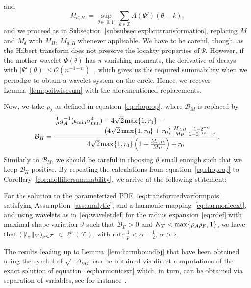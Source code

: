 and
\begin{equation}
    M_{d,H}\coloneqq\sup_{\theta \in [0,1)} \sum_{k \in \mathbb{Z}}A(\Psi')(\theta - k), \label{eq:Mbound4}
\end{equation}
and we proceed as in Subsection~\ref{subsubsec:explicittransformation}, replacing $M$ and $M_d$ with $M_H$, $M_{d,H}$ whenever applicable.
We have to be careful, though, as the Hilbert transform does not preserve the locality properties of $\Psi$.
However, if the mother wavelet $\Psi(\theta)$ has $n$ vanishing moments, the derivative of decays with $\left|  \Psi' (\theta) \right| \leq \mathcal{O}(n^{-1-n})$~\cite{chaudhury2011}, which gives us the required summability when we periodize to obtain a wavelet system on the circle.
Hence, we recover Lemma~\ref{lem:poitwisesum} with the aforementioned replacements.

Now, we take $\rho_\lambda$ as defined in equation~\eqref{eq:rhoprop}, where $\mathcal{B}_M$ is replaced by
\begin{equation}
    \mathcal{B}_H = \frac { \splitfrac{ \frac{1}{\vartheta}g_A^{-1}(\amin\sigma_{\min}^4) - 4\sqrt{2}\max\{1, r_0 \}   -}{\qquad\qquad\qquad\left(4\sqrt{2}\max\{1, r_0 \} + r_0 \right)   \frac{M_{d,H}}{M_H}\frac{1-2^{-\alpha}}{1-2^{-(\alpha - 1)}}}   }{4\sqrt{2}\max\{1, r_0 \}\left( 1+\frac{M_{d,H}}{M_H} \right) + r_0  }.\label{eq:Bhdef}
\end{equation}
Similarly to $\mathcal{B}_M$, we should be careful in choosing $\vartheta$ small enough such that we keep $\mathcal{B}_H$ positive.
By repeating the calculations from equation~\eqref{eq:rhoprop} to Corollary~\ref{cor:mollifiersummability}, we arrive at the following statement:
\begin{corollary}\label{cor:harmonicsummability}
For the solution to the parameterized PDE~\eqref{eq:transformedvarformpois} satisfying Assumption~\ref{ass:analytic}, and a harmonic mapping~\eqref{eq:harmonicext}, and using wavelets as in~\eqref{eq:waveletdef} for the radius expansion~\eqref{eq:rdef} with maximal shape variation $\vartheta$ such that $\mathcal{B}_H>0$ and $K_T < \max\{\rho_A\rho_F,1\}$, we have that
$(\|t_\mu\|_{{V}})_{\mu \in \mathcal{F}}$ $\in \ell^p(\mathcal{F})$, with rate $\frac{1}{p} < \alpha - \frac{1}{2}$,  $\alpha > 2$.
\end{corollary}

\begin{remark} \label{rem:sepofvar}
The results leading up to Lemma~\ref{lem:harmboundbj} that have been obtained using the symbol of $\sqrt{-\Delta_{\partial D}}$ can be obtained via direct computations of the exact solution of equation~\eqref{eq:harmonicext} which, in turn, can be obtained via separation of variables, see for instance~\cite{natalini2008}.
\end{remark}

